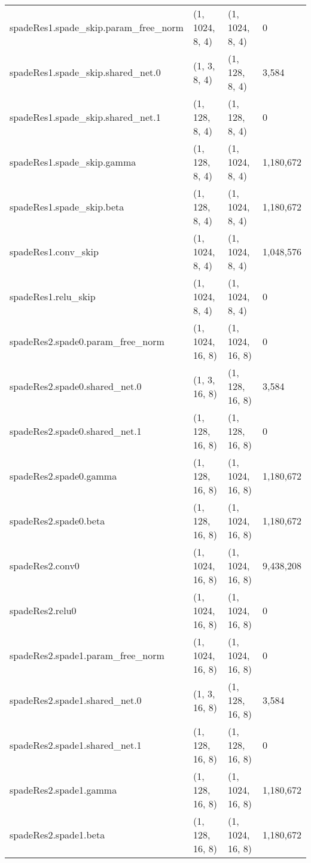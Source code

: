 \begin{longtable}{llll}
    spadeRes1.spade\_skip.param\_free\_norm &     (1, 1024, 8, 4) &     (1, 1024, 8, 4) &            0 \\
        spadeRes1.spade\_skip.shared\_net.0 &        (1, 3, 8, 4) &      (1, 128, 8, 4) &        3,584 \\
        spadeRes1.spade\_skip.shared\_net.1 &      (1, 128, 8, 4) &      (1, 128, 8, 4) &            0 \\
            spadeRes1.spade\_skip.gamma &      (1, 128, 8, 4) &     (1, 1024, 8, 4) &    1,180,672 \\
                spadeRes1.spade\_skip.beta &      (1, 128, 8, 4) &     (1, 1024, 8, 4) &    1,180,672 \\
                    spadeRes1.conv\_skip &     (1, 1024, 8, 4) &     (1, 1024, 8, 4) &    1,048,576 \\
                    spadeRes1.relu\_skip &     (1, 1024, 8, 4) &     (1, 1024, 8, 4) &            0 \\
        spadeRes2.spade0.param\_free\_norm &    (1, 1024, 16, 8) &    (1, 1024, 16, 8) &            0 \\
            spadeRes2.spade0.shared\_net.0 &       (1, 3, 16, 8) &     (1, 128, 16, 8) &        3,584 \\
            spadeRes2.spade0.shared\_net.1 &     (1, 128, 16, 8) &     (1, 128, 16, 8) &            0 \\
                spadeRes2.spade0.gamma &     (1, 128, 16, 8) &    (1, 1024, 16, 8) &    1,180,672 \\
                    spadeRes2.spade0.beta &     (1, 128, 16, 8) &    (1, 1024, 16, 8) &    1,180,672 \\
                        spadeRes2.conv0 &    (1, 1024, 16, 8) &    (1, 1024, 16, 8) &    9,438,208 \\
                        spadeRes2.relu0 &    (1, 1024, 16, 8) &    (1, 1024, 16, 8) &            0 \\
        spadeRes2.spade1.param\_free\_norm &    (1, 1024, 16, 8) &    (1, 1024, 16, 8) &            0 \\
            spadeRes2.spade1.shared\_net.0 &       (1, 3, 16, 8) &     (1, 128, 16, 8) &        3,584 \\
            spadeRes2.spade1.shared\_net.1 &     (1, 128, 16, 8) &     (1, 128, 16, 8) &            0 \\
                spadeRes2.spade1.gamma &     (1, 128, 16, 8) &    (1, 1024, 16, 8) &    1,180,672 \\
                    spadeRes2.spade1.beta &     (1, 128, 16, 8) &    (1, 1024, 16, 8) &    1,180,672 \\

\end{longtable}
